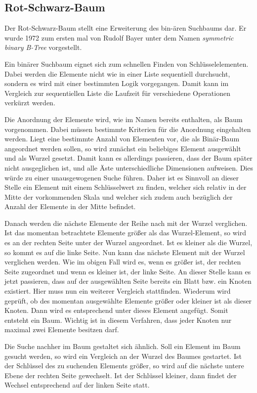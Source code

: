 \subsection{Rot-Schwarz-Baum}\label{s:rb_tree}
Der Rot-Schwarz-Baum stellt eine Erweiterung des bin-ären Suchbaums dar. Er wurde 1972 zum ersten mal von Rudolf Bayer unter dem Namen  \textit{symmetric binary B-Tree} vorgestellt.

Ein binärer Suchbaum eignet sich zum schnellen Finden von Schlüsselelementen. Dabei werden die Elemente nicht wie in einer Liste sequentiell durchsucht, sondern es wird mit einer bestimmten Logik vorgegangen.
Damit kann im Vergleich zur sequentiellen Liste die Laufzeit für verschiedene Operationen verkürzt werden.

Die Anordnung der Elemente wird, wie im Namen bereits enthalten, als Baum vorgenommen. Dabei müssen bestimmte Kriterien für die Anordnung eingehalten werden. Liegt eine bestimmte Anzahl von Elementen vor, die als Binär-Baum angeordnet werden sollen, so wird zunächst ein beliebiges Element ausgewählt und als Wurzel gesetzt. Damit kann es allerdings passieren, dass der Baum später nicht ausgeglichen ist, und alle Äste unterschiedliche Dimensionen aufweisen. Dies würde zu einer unausgewogenen Suche führen. Daher ist es Sinnvoll an dieser Stelle ein Element mit einem Schlüsselwert zu finden, welcher sich relativ in der Mitte der vorkommenden Skala und welcher sich zudem auch bezüglich der Anzahl der Elemente in der Mitte befindet.

Danach werden die nächste Elemente der Reihe nach mit der Wurzel verglichen. Ist das momentan betrachtete Elemente größer als das Wurzel-Element, so wird es an der rechten Seite unter der Wurzel angeordnet. Ist es kleiner als die Wurzel, so kommt es auf die linke Seite. Nun kann das nächste Element mit der Wurzel verglichen werden. Wie im obigen Fall wird es, wenn es größer ist, der rechten Seite zugeordnet und wenn es kleiner ist, der linke Seite. An dieser Stelle kann es jetzt passieren, dass auf der ausgewählten Seite bereits ein Blatt bzw. ein Knoten existiert. Hier muss nun ein weiterer Vergleich stattfinden. Wiederum wird geprüft, ob des momentan ausgewählte Elemente größer oder kleiner ist als dieser Knoten. Dann wird es entsprechend unter dieses Element angefügt. Somit entsteht ein Baum. Wichtig ist in diesem Verfahren, dass jeder Knoten nur maximal zwei Elemente besitzen darf. 

Die Suche nachher im Baum gestaltet sich ähnlich. Soll ein Element im Baum gesucht werden, so wird ein Vergleich an der Wurzel des Baumes gestartet. Ist der Schlüs\-sel des zu suchenden Elements größer, so wird auf die nächste untere Ebene der rechten Seite gewechselt. Ist der Schlüssel kleiner, dann findet der Wechsel entsprechend auf der linken Seite statt. 

